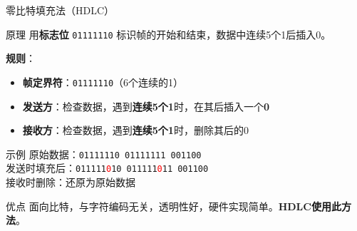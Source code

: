 \documentclass[10pt, aspectratio=169]{beamer}
\begin{document}
\begin{frame}{零比特填充法（HDLC）}
    \begin{block}{原理}
        用\textbf{标志位} \texttt{01111110} 标识帧的开始和结束，数据中连续5个1后插入0。
    \end{block}
    \vspace{0.3em}
    \textbf{规则}：
    \begin{itemize}
        \item \textbf{帧定界符}：\texttt{01111110}（6个连续的1）
        \item \textbf{发送方}：检查数据，遇到\textbf{连续5个1}时，在其后插入一个\textbf{0}
        \item \textbf{接收方}：检查数据，遇到\textbf{连续5个1}时，删除其后的0
    \end{itemize}
    \vspace{0.5em}
    \begin{exampleblock}{示例}
        原始数据：\texttt{01111110 01111111 001100}\\
        发送时填充后：\texttt{011111\textcolor{red}{0}10 011111\textcolor{red}{0}11 001100}\\
        接收时删除：还原为原始数据
    \end{exampleblock}
    \vspace{0.3em}
    \begin{block}{优点}
        面向比特，与字符编码无关，透明性好，硬件实现简单。\textbf{HDLC使用此方法}。
    \end{block}
\end{frame}
\end{document}
